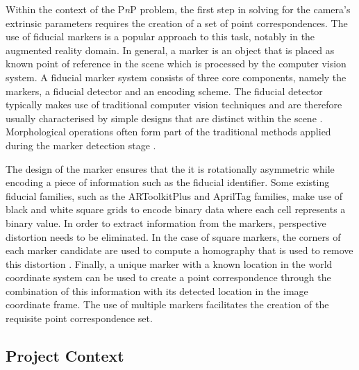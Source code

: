 Within the context of the P\textit{n}P problem, the first step in solving for the camera's extrinsic parameters requires the creation of a set of point correspondences. The use of fiducial markers is a popular approach to this task, notably in the augmented reality domain. In general, a marker is an object that is placed as known point of reference in the scene which is processed by the computer vision system. A fiducial marker system consists of three core components, namely the markers, a fiducial detector and an encoding scheme. The fiducial detector typically makes use of traditional computer vision techniques and are therefore usually characterised by simple designs that are distinct within the scene \cite{Zhang:DeepTag_General_Framework_for_Fiducial_Marker_Design}. Morphological operations often form part of the traditional methods applied during the marker detection stage  \cite{Kostak:Designing_a_Simple_Fiducial_Marker}. 

The design of the marker ensures that the it is rotationally asymmetric while encoding a piece of information such as the fiducial identifier. Some existing fiducial families, such as the ARToolkitPlus \cite{Wagner:ARToolKitPlus} and AprilTag \cite{Olson:AprilTag} families, make use of black and white square grids to encode binary data where each cell represents a binary value. In order to extract information from the markers, perspective distortion needs to be eliminated. In the case of square markers, the corners of each marker candidate are used to compute a homography that is used to remove this distortion \cite{Hirzer:Marker_Detection_for_Augmented_Reality_Applications}. Finally, a unique marker with a known location in the world coordinate system can be used to create a point correspondence through the combination of this information with its detected location in the image coordinate frame. The use of multiple markers facilitates the creation of the requisite point correspondence set.


\subsection{Project Context}


